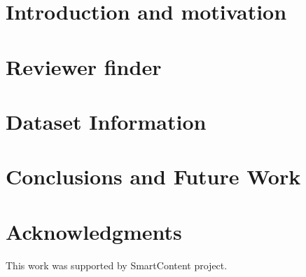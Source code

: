 \documentclass{llncs}
\begin{document}
\section{Introduction and motivation}\label{sec:Introduction}


%

\section{Reviewer finder}\label{sec:Motivation}


\section{Dataset Information}\label{sec:DataInfo}


%


\section{Conclusions and Future Work}\label{sec:Conclusions}





\section*{Acknowledgments}

This work was supported by SmartContent project.



%






\clearpage
{} %
\renewcommand{\indexname}{Author Index}
\printindex \clearpage
{} %
\renewcommand{\indexname}{Subject Index}
%
\end{document}
